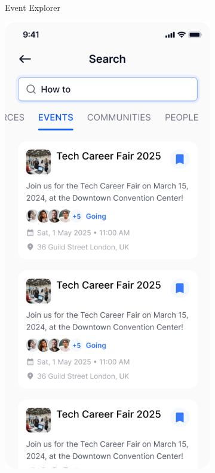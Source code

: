 \begin{figure}[H]
\begin{subfigure}[b]{0.22\textwidth}
        \caption{Event Explorer}
        \label{fig:mobile-events}
    \end{subfigure}
    \hfill
    \begin{subfigure}[b]{0.22\textwidth}
        \centering
        \includegraphics[width=\textwidth,height=0.3\textheight,keepaspectratio]{images/front_end_screens/mobile-searching.png}

\end{subfigure}
\end{figure}
